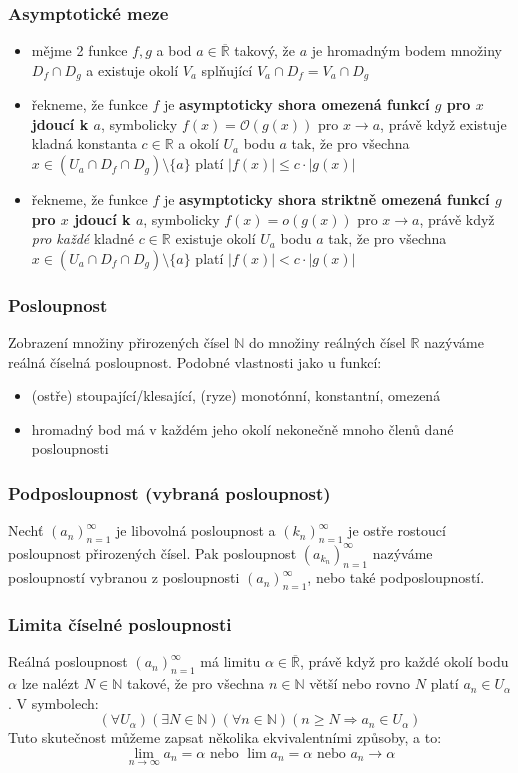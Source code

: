 \subsubsection*{Asymptotické meze}
\begin{itemize}
	\item mějme 2 funkce $f, g$ a bod $a \in \overline{\mathbb{R}}$ takový, že $a$ je hromadným bodem množiny $D_f \cap D_g$ a existuje okolí $V_a$ splňující $V_a \cap D_f = V_a \cap D_g$
	\item řekneme, že funkce $f$ je\textbf{ asymptoticky shora omezená funkcí $g$ pro $x$ jdoucí k $a$}, symbolicky $f(x) = \mathcal{O}(g(x))$ pro $x \rightarrow a$, právě když existuje kladná konstanta $c \in \mathbb{R}$ a okolí $U_a$ bodu $a$ tak, že pro všechna $x \in (U_a \cap D_f \cap D_g) \setminus \{a\}$ platí $|f(x)| \leq c \cdot |g(x)|$
	\item řekneme, že funkce $f$ je\textbf{ asymptoticky shora striktně omezená funkcí $g$ pro $x$ jdoucí k $a$}, symbolicky $f(x) = o(g(x))$ pro $x \rightarrow a$, právě když \textit{pro každé} kladné $c \in \mathbb{R}$ existuje okolí $U_a$ bodu $a$ tak, že pro všechna $x \in (U_a \cap D_f \cap D_g) \setminus \{a\}$ platí $|f(x)| < c \cdot |g(x)|$
\end{itemize}

\subsubsection*{Posloupnost}
Zobrazení množiny přirozených čísel $\mathbb{N}$ do množiny reálných čísel $\mathbb{R}$ nazýváme reálná číselná posloupnost. Podobné vlastnosti jako u funkcí:
\begin{itemize}
	\item (ostře) stoupající/klesající, (ryze) monotónní, konstantní, omezená
	\item hromadný bod má v každém jeho okolí nekonečně mnoho členů dané posloupnosti
\end{itemize}

\subsubsection*{Podposloupnost (vybraná posloupnost)}
Nechť $(a_n)_{n=1}^\infty$ je libovolná posloupnost a $(k_n)_{n=1}^\infty$ je ostře rostoucí posloupnost přirozených čísel. Pak posloupnost $(a_{k_n})_{n=1}^\infty$ nazýváme posloupností vybranou z posloupnosti $(a_n)_{n=1}^\infty$, nebo také podposloupností.

\subsubsection*{Limita číselné posloupnosti}
Reálná posloupnost $(a_n)^\infty_{n=1}$ má limitu $\alpha \in \overline{\mathbb{R}}$, právě když pro každé okolí bodu $\alpha$ lze nalézt $N \in \mathbb{N}$ takové, že pro všechna $n \in \mathbb{N}$ větší nebo rovno $N$ platí $a_n \in U_\alpha$. V symbolech: \[(\forall U_\alpha)(\exists N \in \mathbb{N})(\forall n \in \mathbb{N})(n \geq N \Rightarrow a_n \in U_\alpha)\]
Tuto skutečnost můžeme zapsat několika ekvivalentními způsoby, a to: \[\lim_{n\to\infty} a_n = \alpha \text{ nebo } \lim a_n = \alpha \text{ nebo } a_n\to\alpha \]

